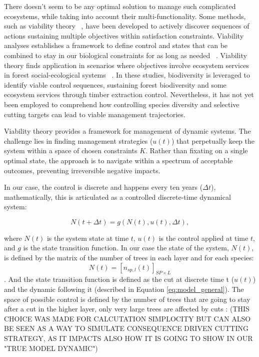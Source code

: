 \documentclass{article}
\begin{document}
There doesn't seem to be any optimal solution to manage such complicated ecosystems, while taking into account their multi-functionality. Some methods, such as viability theory ~\autocite{aubinStochasticViabilityInvariance1990}, have been developed to actively discover sequences of actions sustaining multiple objectives within satisfaction constraints. Viability analyses establishes a framework to define control and states that can be combined to stay in our biological constraints for as long as needed ~\autocite{rougeExtendingViabilityTheory2013}.
Viability theory finds application in scenarios where objectives involve ecosystem services in forest social-ecological systems ~\autocite{mathiasUsingViabilityTheory2015, Houballah2021, Houballah2023}. In these studies, biodiversity is leveraged to identify viable control sequences, sustaining forest biodiversity and some ecosystem services through timber extraction control.
Nevertheless, it has not yet been employed to comprehend how controlling species diversity and selective cutting targets can lead to viable management trajectories.

Viability theory provides a framework for management of dynamic systems. The challenge lies in finding management strategies (\(u(t)\)) that perpetually keep the system within a space of chosen constraints $K$. Rather than fixating on a single optimal state, the approach is to navigate within a spectrum of acceptable outcomes, preventing irreversible negative impacts.









In our case, the control is discrete and happens every ten years ($\Delta t$), mathematically, this is articulated as a controlled discrete-time dynamical system:

\begin{equation}
    N(t+\Delta t) = g(N(t), u(t), \Delta t),
\end{equation}

where \(N(t)\) is the system state at time \(t\), \(u(t)\) is the control applied at time \(t\), and \(g\) is the state transition function. In our case the state of the system, \(N(t)\), is defined by the matrix of the number of trees in each layer and for each species: \[ N(t) = [n_{sp,l}(t)]_{SP \times L} \]. And the state transition function is defined as the cut at discrete time t (\(u(t)\)) and the dynamic following it (described in Equation \eqref{eq:model_general}). The space of possible control is defined by the number of trees that are going to stay after a cut in the higher layer, only very large trees are affected by cuts : (THIS CHOICE WAS MADE FOR CALCUTATION SIMPLOCITY BUT CAN ALSO BE SEEN AS A WAY TO SIMULATE CONSEQUENCE DRIVEN CUTTING STRATEGY, AS IT IMPACTS ALSO HOW IT IS GOING TO SHOW IN OUR "TRUE MODEL DYNAMIC")
\end{document}
